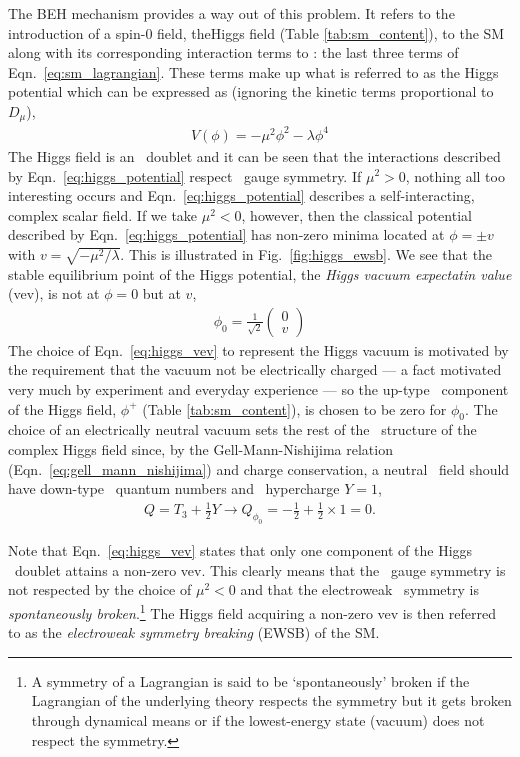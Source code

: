The BEH mechanism provides a way out of this problem. It refers to the introduction of a
spin-0 field, theHiggs field (Table \ref{tab:sm_content}), to the SM along with its corresponding interaction
terms to \SML: the last three terms of Eqn.~\ref{eq:sm_lagrangian}. These terms make up
what is referred to as the Higgs potential which can be expressed as (ignoring the
kinetic terms proportional to $\mathit{D}_{\mu}$),
\begin{align}
	V(\phi) = - \mu^2 \phi^2 - \lambda \phi^4
	\label{eq:higgs_potential}
\end{align}
The Higgs field is an \SUtwo~doublet and it can be seen that the interactions
described by Eqn.~\ref{eq:higgs_potential} respect \SUtwo~gauge symmetry.
If $\mu^2>0$, nothing all too interesting occurs and Eqn.~\ref{eq:higgs_potential} describes
a self-interacting, complex scalar field. If we take $\mu^2<0$, however, then the classical
potential described by Eqn.~\ref{eq:higgs_potential} has non-zero minima located at
$\phi = \pm v$ with $v = \sqrt{-\mu^2 / \lambda}$.
This is illustrated in Fig.~\ref{fig:higgs_ewsb}. We see that the stable equilibrium point
of the Higgs potential, the \textit{Higgs vacuum expectatin value} (vev), is not at $\phi = 0$
but at $v$,
\begin{align}
	\phi_0 = \frac{1}{\sqrt{2}} \left( \begin{matrix} 0 \\ v \end{matrix} \right)
	\label{eq:higgs_vev}
\end{align}
The choice of Eqn.~\ref{eq:higgs_vev} to represent the Higgs vacuum is motivated by
the requirement that the vacuum not be electrically charged --- a fact motivated very much
by experiment and everyday experience --- so the up-type \SUtwo~component of the Higgs field, $\phi^+$ (Table \ref{tab:sm_content}), is chosen to be zero for $\phi_0$. The choice of an
electrically neutral vacuum sets the rest of the \SUewk~structure of the complex Higgs field
since, by the Gell-Mann-Nishijima relation (Eqn.~\ref{eq:gell_mann_nishijima}) and charge
conservation,
a  neutral \SUewk~field should have down-type \SUtwo~quantum numbers and \Uone~hypercharge
$Y=1$,
\begin{align}
	Q = T_3 + \frac{1}{2}Y \rightarrow Q_{\phi_0} = -\frac{1}{2} + \frac{1}{2} \times 1 = 0.
\end{align}

Note that Eqn.~\ref{eq:higgs_vev} states that only one component of the Higgs \SUtwo~doublet
attains a non-zero vev. This clearly means that the \SUtwo~gauge symmetry is not respected
by the choice of $\mu^2 < 0$ and that the electroweak \SUewk~symmetry is
\textit{spontaneously broken}.\footnote{A symmetry of a Lagrangian is said to be
	`spontaneously' broken if the Lagrangian of the underlying theory
	respects the symmetry but it gets broken through dynamical means or if the lowest-energy
	state (vacuum) does not respect the symmetry.
} The Higgs field
acquiring a non-zero vev is then referred to as the \textit{electroweak symmetry breaking} (EWSB) of the SM.

